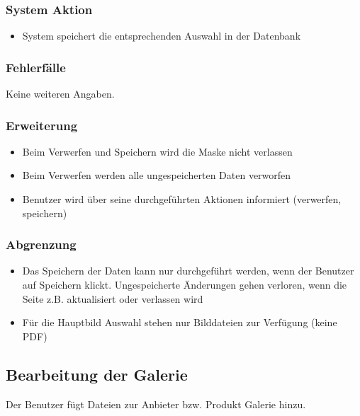 \documentclass[a4paper,12pt]{article}
\begin{document}
\subsubsection{System Aktion}\label{system-aktion-4}

\begin{itemize}

\item
  System speichert die entsprechenden Auswahl in der Datenbank
\end{itemize}

\subsubsection{Fehlerfälle}\label{fehlerfalle-4}
Keine weiteren Angaben.

\subsubsection{Erweiterung}\label{erweiterung-4}

\begin{itemize}

\item
  Beim Verwerfen und Speichern wird die Maske nicht verlassen
\item
  Beim Verwerfen werden alle ungespeicherten Daten verworfen
\item
  Benutzer wird über seine durchgeführten Aktionen informiert
  (verwerfen, speichern)
\end{itemize}

\subsubsection{Abgrenzung}\label{abgrenzung-4}

\begin{itemize}

\item
  Das Speichern der Daten kann nur durchgeführt werden, wenn der
  Benutzer auf Speichern klickt. Ungespeicherte Änderungen gehen
  verloren, wenn die Seite z.B. aktualisiert oder verlassen wird
\item
  Für die Hauptbild Auswahl stehen nur Bilddateien zur Verfügung (keine
  PDF)
\end{itemize}

\subsection{Bearbeitung der Galerie}
Der Benutzer fügt Dateien zur Anbieter bzw. Produkt Galerie hinzu.
\end{document}
